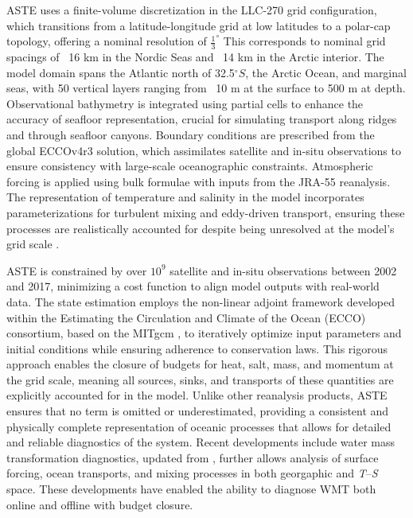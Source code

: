 \documentclass[draft]{agujournal2019}
\begin{document}
ASTE uses a finite-volume discretization in the LLC-270 grid configuration, which transitions from a latitude-longitude grid at low latitudes to a polar-cap topology, offering a nominal resolution of $\frac{1}{3}^\circ$ This corresponds to nominal grid spacings of ~16 km in the Nordic Seas and ~14 km in the Arctic interior. The model domain spans the Atlantic north of 32.5$^\circ S$, the Arctic Ocean, and marginal seas, with 50 vertical layers ranging from ~10 m at the surface to 500 m at depth. Observational bathymetry is integrated using partial cells to enhance the accuracy of seafloor representation, crucial for simulating transport along ridges and through seafloor canyons. Boundary conditions are prescribed from the global ECCOv4r3 solution, which assimilates satellite and in-situ observations to ensure consistency with large-scale oceanographic constraints. Atmospheric forcing is applied using bulk formulae with inputs from the JRA-55 reanalysis. The representation of temperature and salinity in the model incorporates parameterizations for turbulent mixing and eddy-driven transport, ensuring these processes are realistically accounted for despite being unresolved at the model's grid scale .

ASTE is constrained by over $10^9$ satellite and in-situ observations between 2002 and 2017, minimizing a cost function to align model outputs with real-world data. The state estimation employs the non-linear adjoint framework developed within the Estimating the Circulation and Climate of the Ocean (ECCO) consortium, based on the MITgcm \cite{marshall_1997}, to iteratively optimize input parameters and initial conditions while ensuring adherence to conservation laws. This rigorous approach enables the closure of budgets for heat, salt, mass, and momentum at the grid scale, meaning all sources, sinks, and transports of these quantities are explicitly accounted for in the model. Unlike other reanalysis products, ASTE ensures that no term is omitted or underestimated, providing a consistent and physically complete representation of oceanic processes that allows for detailed and reliable diagnostics of the system. Recent developments include water mass transformation diagnostics, updated from , further allows analysis of surface forcing, ocean transports, and mixing processes in both georgaphic and \emph{T}--\emph{S} space. These developments have enabled the ability to diagnose WMT both online and offline with budget closure.
\end{document}
